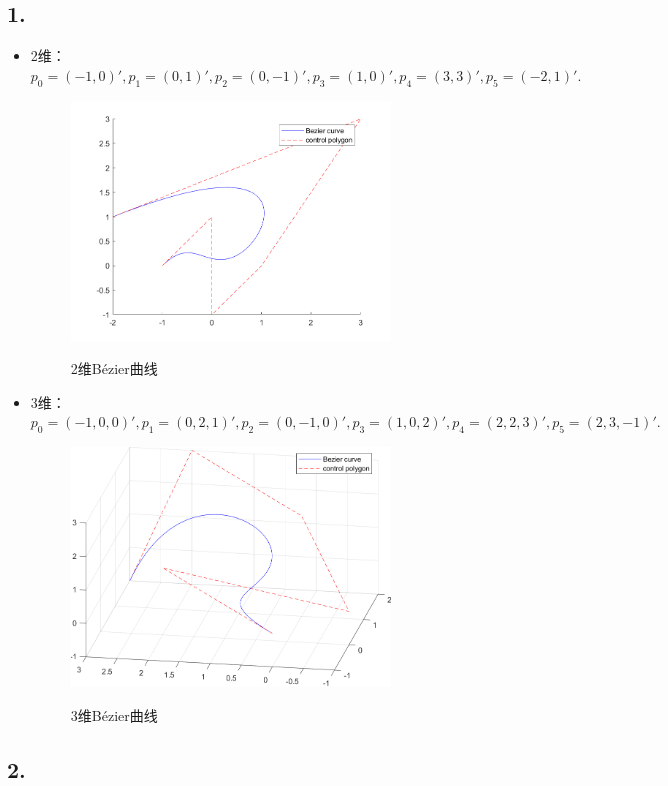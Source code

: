 \documentclass[utf8]{ctexart}
\begin{document}
\subsection*{1.}
\begin{itemize}
    \item 2维：$p_0 = (-1,0)',
    p_1 = (0,1)',
    p_2 = (0,-1)',
    p_3 = (1,0)',
    p_4 = (3,3)',
    p_5 = (-2,1)'.$

    \begin{figure}[H]
        \centering
        \includegraphics[width=0.8\textwidth]{bezier_2d.png}
        \label{fig1}
        \caption*{2维Bézier曲线}
    \end{figure}

    \item 3维：$p_0 = (-1,0,0)',
    p_1 = (0,2,1)',
    p_2 = (0,-1,0)',
    p_3 = (1,0,2)',
    p_4 = (2,2,3)',
    p_5 = (2,3,-1)'.$
    \begin{figure}[H]
        \centering
        \includegraphics[width=0.8\textwidth]{bezier_3d.png}
        \label{fig2}
        \caption{3维Bézier曲线}
    \end{figure}
\end{itemize}

\subsection*{2.}
\end{document}
